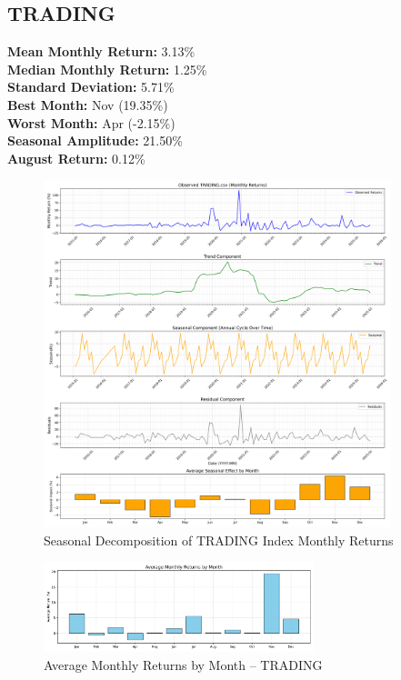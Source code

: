 \documentclass[12pt]{article}
\begin{document}
\clearpage

\subsection{TRADING}
\textbf{Mean Monthly Return:} 3.13\% \\
\textbf{Median Monthly Return:} 1.25\% \\
\textbf{Standard Deviation:} 5.71\% \\
\textbf{Best Month:} Nov (19.35\%) \\
\textbf{Worst Month:} Apr (-2.15\%) \\
\textbf{Seasonal Amplitude:} 21.50\% \\
\textbf{August Return:} 0.12\% \\

\begin{figure}[h!]
    \centering
    \includegraphics[width=0.9\textwidth]{decomposition_outputs/TRADING_seasonal_decomposition.png}
    \caption{Seasonal Decomposition of TRADING Index Monthly Returns}
\end{figure}

\begin{figure}[h!]
    \centering
    \includegraphics[width=0.7\textwidth]{decomposition_outputs/TRADING_avg_monthly_returns.png}
    \caption{Average Monthly Returns by Month -- TRADING}
\end{figure}
\end{document}
